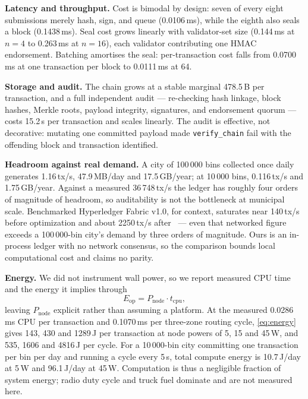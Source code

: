 \documentclass{llncs}
\begin{document}
\textbf{Latency and throughput.} Cost is bimodal by design: seven of every
eight submissions merely hash, sign, and queue (0.0106\,ms), while the eighth
also seals a block (0.1438\,ms). Seal cost grows linearly with validator-set
size (0.144\,ms at $n=4$ to 0.263\,ms at $n=16$), each validator contributing
one HMAC endorsement. Batching amortises the seal: per-transaction cost falls
from 0.0700\,ms at one transaction per block to 0.0111\,ms at 64.

\textbf{Storage and audit.} The chain grows at a stable marginal 478.5\,B per
transaction, and a full independent audit --- re-checking hash linkage, block
hashes, Merkle roots, payload integrity, signatures, and endorsement quorum ---
costs 15.2\,\textmu s per transaction and scales linearly. The audit is
effective, not decorative: mutating one committed payload made
\texttt{verify\_chain} fail with the offending block and transaction
identified.

\textbf{Headroom against real demand.} A city of 100\,000 bins collected once
daily generates 1.16\,tx/s, 47.9\,MB/day and 17.5\,GB/year; at 10\,000 bins,
0.116\,tx/s and 1.75\,GB/year. Against a measured 36\,748\,tx/s the ledger has
roughly four orders of magnitude of headroom, so auditability is not the
bottleneck at municipal scale. Benchmarked Hyperledger Fabric v1.0, for
context, saturates near 140\,tx/s before optimization and about 2250\,tx/s
after~\cite{thakkar} --- even that networked figure exceeds a 100\,000-bin
city's demand by three orders of magnitude. Ours is an in-process ledger with
no network consensus, so the comparison bounds local computational cost and
claims no parity.

\textbf{Energy.} We did not instrument wall power, so we report measured CPU
time and the energy it implies through
\begin{equation}
  E_{\mathrm{op}} = P_{\mathrm{node}} \cdot t_{\mathrm{cpu}},
  \label{eq:energy}
\end{equation}
leaving $P_{\mathrm{node}}$ explicit rather than assuming a platform. At the
measured 0.0286\,ms CPU per transaction and 0.1070\,ms per three-zone routing
cycle, \eqref{eq:energy} gives 143, 430 and 1289\,\textmu J per transaction at
node powers of 5, 15 and 45\,W, and 535, 1606 and 4816\,\textmu J per cycle.
For a 10\,000-bin city committing one transaction per bin per day and running a
cycle every 5\,s, total compute energy is 10.7\,J/day at 5\,W and 96.1\,J/day
at 45\,W. Computation is thus a negligible fraction of system energy; radio
duty cycle and truck fuel dominate and are not measured here.
\end{document}
